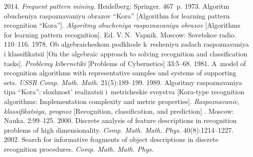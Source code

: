 

\vspace*{-16pt}

  

\vspace*{12pt}

  \begin{multicols}{2}

\renewcommand{\bibname}{\protect\rmfamily References}

{\small\frenchspacing
 {%
 \begin{thebibliography}{99}
 2014. \textit{Frequent pattern mining}. Heidelberg: Springer. 
467~p.
 1973. Algoritm obucheniya ras\-po\-zna\-va\-niyu obrazov 
``Kora''  [Algorithm for learning \mbox{pattern} recognition ``Kora'']. \textit{Algoritmy obucheniya raspoznavaniyu obrazov}
[Algorithms 
for learning pattern recognition]. Ed. V.\,N.~Vapnik. Moscow: Sovetskoe radio. 110--116.
 1978. Ob algebraicheskom podkhode k~resheniyu zadach 
raspoznavaniya i klassifikatsii [On the algebraic approach to solving recognition and 
classification tasks]. \textit{Problemy kibernetiki} [Problems of Cybernetics]  
33:5--68.
 1981. A~model of recognition algorithms 
with representative samples and systems of supporting sets. \textit{USSR Comp. Math. 
Math.} 21(5):189--199.
 1989. Algoritmy raspoznavaniya tipa ``Kora'': slozhnost' 
realizatsii i~metricheskie svoystva [Kora-type recognition algorithms: 
Implementation complexity and metric properties]. \textit{Raspoznavanie, 
klassifikatsiya, prognoz} [Recognition, 
classification, and prediction] . Moscow: Nauka. 
2:99--125.
 2000. Discrete analysis of feature descriptions 
in recognition problems of high dimensionality. \textit{Comp. Math. Math. Phys.} 
40(8):1214--1227.
 2002. Search for informative fragments of object 
descriptions in discrete recognition procedures. \textit{Comp. Math. Math. Phys.} 

\end{thebibliography}}}
\end{multicols}
